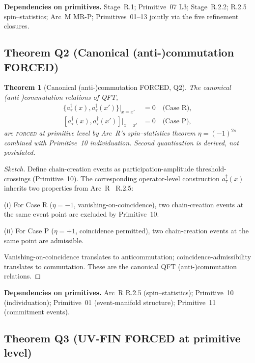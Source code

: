 \documentclass[11pt,a4paper]{article}
\newtheorem{theorem}{Theorem}[section]
\begin{document}
\textbf{Dependencies on primitives.} Stage~R.1; Primitive~07 L3; Stage~R.2.2; R.2.5 spin--statistics; Arc~M MR-P; Primitives~01--13 jointly via the five refinement closures.

\subsection{Theorem Q2 (Canonical (anti-)commutation FORCED)}

\begin{theorem}[Canonical (anti-)commutation FORCED, Q2]
The canonical (anti-)commutation relations of QFT,
\begin{align}
\{a^\dagger_\tau(x), a^\dagger_\tau(x')\}\big|_{x = x'} &= 0 \quad \text{(Case R)}, \\
[a^\dagger_\tau(x), a^\dagger_\tau(x')]\big|_{x = x'} &= 0 \quad \text{(Case P)},
\end{align}
are \textsc{forced} at primitive level by Arc~R's spin--statistics theorem $\eta = (-1)^{2s}$ combined with Primitive~10 individuation. Second quantisation is derived, not postulated.
\end{theorem}

\begin{proof}[Sketch]
Define chain-creation events as participation-amplitude threshold-crossings (Primitive~10). The corresponding operator-level construction $a^\dagger_\tau(x)$ inherits two properties from Arc~R~\cite{arcr} R.2.5:

(i) For Case R ($\eta = -1$, vanishing-on-coincidence), two chain-creation events at the same event point are excluded by Primitive~10.

(ii) For Case P ($\eta = +1$, coincidence permitted), two chain-creation events at the same point are admissible.

Vanishing-on-coincidence translates to anticommutation; coincidence-admissibility translates to commutation. These are the canonical QFT (anti-)commutation relations.
\end{proof}

\textbf{Dependencies on primitives.} Arc~R R.2.5 (spin--statistics); Primitive~10 (individuation); Primitive~01 (event-manifold structure); Primitive~11 (commitment events).

\subsection{Theorem Q3 (UV-FIN FORCED at primitive level)}
\end{document}
